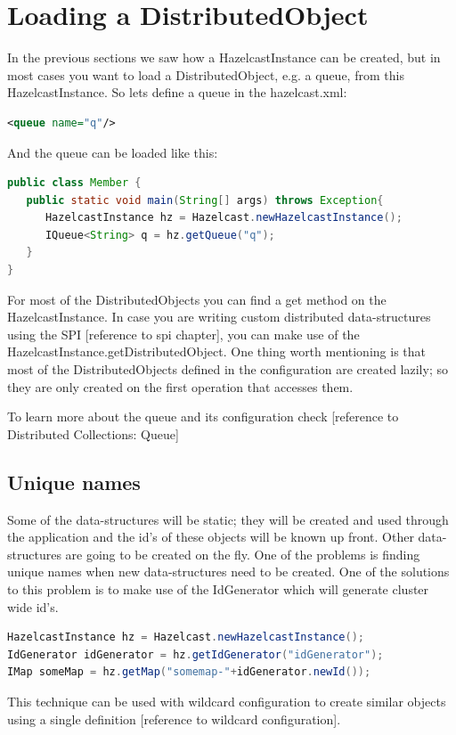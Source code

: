 \section{Loading a DistributedObject}
In the previous sections we saw how a HazelcastInstance can be created, but in most cases you want to load a DistributedObject, e.g. a queue, from this HazelcastInstance. So lets define a queue in the hazelcast.xml:
\begin{lstlisting}[language=xml]
<queue name="q"/>
\end{lstlisting}
And the queue can be loaded like this:
\begin{lstlisting}[language=java]
public class Member {
   public static void main(String[] args) throws Exception{
      HazelcastInstance hz = Hazelcast.newHazelcastInstance();
      IQueue<String> q = hz.getQueue("q");
   }
}
\end{lstlisting}
For most of the DistributedObjects you can find a get method on the HazelcastInstance. In case you are writing custom distributed data-structures using the SPI [reference to spi chapter], you can make use of the HazelcastInstance.getDistributedObject. One thing worth mentioning is that most of the DistributedObjects defined in the configuration are created lazily; so they are only created on the first operation that accesses them.

To learn more about the queue and its configuration check [reference to Distributed Collections: Queue]
\subsection{Unique names}
Some of the data-structures will be static; they will be created and used through the application and the id's of these objects will be known up front. Other data-structures are going to be created on the fly. One of the problems is finding unique names when new data-structures need to be created. One of the solutions to this problem is to make use of the IdGenerator which will generate cluster wide id's. 

\begin{lstlisting}[language=java]
HazelcastInstance hz = Hazelcast.newHazelcastInstance();
IdGenerator idGenerator = hz.getIdGenerator("idGenerator");
IMap someMap = hz.getMap("somemap-"+idGenerator.newId());
\end{lstlisting}
This technique can be used with wildcard configuration to create similar objects using a single definition [reference to wildcard configuration]. 

